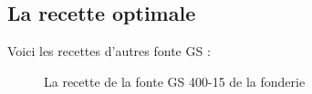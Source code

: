 \documentclass[12pt]{article}
\begin{document}
\begin{appendices}
    \section{La recette optimale}
    Voici les recettes d'autres fonte GS :

    




\begin{figure}[H]
    \centering
    \caption{La recette de la fonte GS 400-15 de la fonderie}
    \label{fig:Recette7}
\end{figure}



\end{appendices}
\end{document}
